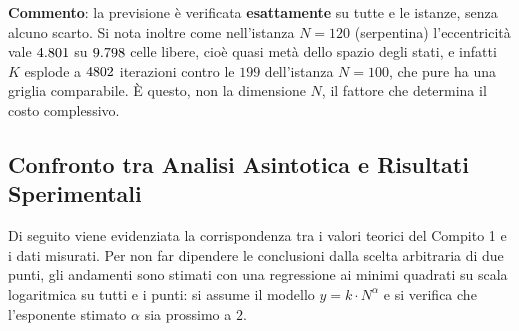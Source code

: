\noindent
\textbf{Commento}: la previsione è verificata \textbf{esattamente} su tutte e \benchNistanze{} le istanze, senza alcuno scarto. Si nota inoltre come nell'istanza $N=120$ (serpentina) l'eccentricità vale $4.801{}$ su $9.798{}$ celle libere, cioè quasi metà dello spazio degli stati, e infatti $K$ esplode a $4802{}$ iterazioni contro le $199$ dell'istanza $N=100$, che pure ha una griglia comparabile. È questo, non la dimensione $N$, il fattore che determina il costo complessivo.

\clearpage
\subsection{Confronto tra Analisi Asintotica e Risultati Sperimentali}
Di seguito viene evidenziata la corrispondenza tra i valori teorici del Compito 1 e i dati misurati. Per non far dipendere le conclusioni dalla scelta arbitraria di due punti, gli andamenti sono stimati con una regressione ai minimi quadrati su scala logaritmica su tutti e \benchNistanze{} i punti: si assume il modello $y = k \cdot N^{\alpha}$ e si verifica che l'esponente stimato $\alpha$ sia prossimo a $2$.

